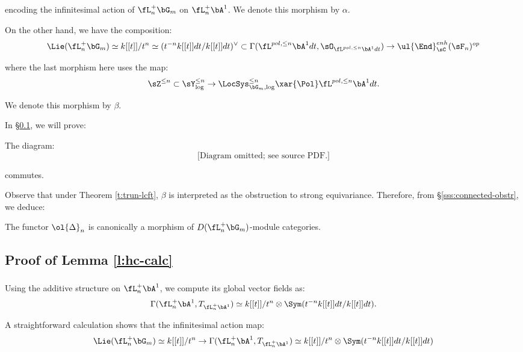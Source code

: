  encoding the infinitesimal action of $\fL_n^+\bG_m$ on
$\fL_n^+\bA^1$. We denote this morphism by $\alpha$.

On the other hand, we have the composition:
%
\[
\Lie(\fL_n^+\bG_m) \simeq k[[t]]/t^n \simeq
(t^{-n} k[[t]]dt/k[[t]] dt)^{\vee} \subset
\Gamma(\fL^{pol,\leq n} \bA^1 dt,\sO_{\fL^{pol,\leq n} \bA^1 dt})
\to \ul{\End}_{\sC}^{enh}(\sF_n)^{op}
\]

 where the last morphism here uses the map:
%
\[
\sZ^{\leq n} \subset \sY_{\log}^{\leq n} \to \LocSys_{\bG_m,\log}^{\leq n}
\xar{\Pol} \fL^{pol,\leq n} \bA^1 dt.
\]

 We denote this morphism by $\beta$.

In \S \ref{ss:hc-calc-pf}, we will prove:

\begin{lem}
\notready\label{l:hc-calc}

The diagram:
%
\[
\text{[Diagram omitted; see source PDF.]}
\]

 commutes.

\end{lem}

Observe that under Theorem \ref{t:trun-lcft}, $\beta$ is interpreted
as the obstruction to strong equivariance. Therefore,
from \S \ref{sss:connected-obstr}, we deduce:

\begin{prop}
\notready\label{p:eq}

The functor $\ol{\Delta}_n$ is canonically a morphism of
$D(\fL_n^+\bG_m)$-module categories.

\end{prop}

\subsection{Proof of Lemma \ref{l:hc-calc}}\label{ss:hc-calc-pf}

\subsubsection{}

Using the additive structure on $\fL_n^+\bA^1$,
we compute its global vector fields as:
%
\[
\Gamma(\fL_n^+\bA^1,T_{\fL_n^+\bA^1}) \simeq
k[[t]]/t^n \otimes \Sym(t^{-n}k[[t]]dt/k[[t]]dt).
\]

 A straightforward calculation shows that the infinitesimal action
map:
%
\[
\Lie(\fL_n^+\bG_m) \simeq k[[t]]/t^n \to \Gamma(\fL_n^+\bA^1,T_{\fL_n^+\bA^1})
\simeq k[[t]]/t^n \otimes \Sym(t^{-n}k[[t]]dt/k[[t]]dt)
\]

